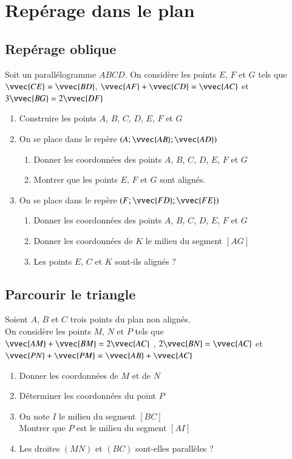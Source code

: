 \documentclass[oneside,12pt]{article}          %
\begin{document}
\section{Repérage dans le plan}

\subsection{Repérage oblique}
Soit un parallélogramme $ABCD$. On considère les points $E$, $F$ et $G$ tels que $\vvec{CE}=\vvec{BD}$, $\vvec{AF}+\vvec{CD}=\vvec{AC}$ et $3\vvec{BG}=2\vvec{DF}$
\begin{enumerate}
    \item Construire les points $A$, $B$, $C$, $D$, $E$, $F$ et $G$
    \item On se place dans le repère $(A;\vvec{AB};\vvec{AD})$
    \begin{enumerate}
        \item Donner les coordonnées des points $A$, $B$, $C$, $D$, $E$, $F$ et $G$
        \item Montrer que les points $E$, $F$ et $G$ sont alignés.
    \end{enumerate}
    \item On se place dans le repère $(F;\vvec{FD};\vvec{FE})$
    \begin{enumerate}
        \item Donner les coordonnées des points $A$, $B$, $C$, $D$, $E$, $F$ et $G$
        \item Donner les coordonnées de $K$ le milieu du segment $[AG]$
        \item Les points $E$, $C$ et $K$ sont-ils alignés ?
    \end{enumerate}
\end{enumerate}



\subsection{Parcourir le triangle}
Soient $A$, $B$ et $C$ trois points du plan non alignés.\\
On considère les points $M$, $N$ et $P$ tels que $\vvec{AM}+\vvec{BM}=2\vvec{AC}$ , $2\vvec{BN}=\vvec{AC}$ et $\vvec{PN}+\vvec{PM}=\vvec{AB}+\vvec{AC}$
\begin{enumerate}
    \item Donner les coordonnées de $M$ et de $N$
    \item Déterminer les coordonnées du point $P$
    \item On note $I$ le milieu du segment $[BC]$\\
    Montrer que $P$ est le milieu du segment $[AI]$
    \item Les droites $(MN)$ et $(BC)$ sont-elles parallèles ?
\end{enumerate}
\end{document}

